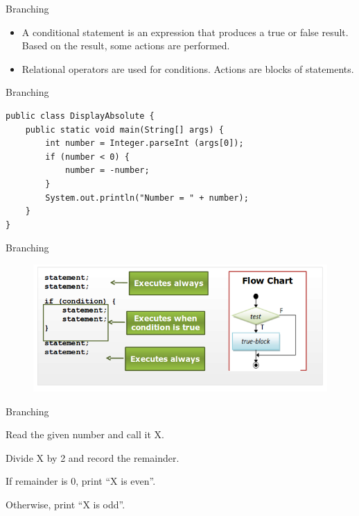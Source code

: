 \documentclass[12pt]{beamer}
\begin{document}
\begin{frame}{Branching}
 \begin{itemize}
  \item A conditional statement is an expression that produces a true or false result. Based on the result, some actions are performed.
  \item Relational operators are used for conditions. Actions are blocks of statements. 
 \end{itemize}
\end{frame}

\begin{frame}[fragile]{Branching}
 \begin{lstlisting}[numbers=none]
public class DisplayAbsolute {
    public static void main(String[] args) {
        int number = Integer.parseInt (args[0]);
        if (number < 0) {
            number = -number;
        }
        System.out.println("Number = " + number);
    }
}
 \end{lstlisting}
\end{frame}

\begin{frame}{Branching}
 \begin{figure}[H]
 \begin{center}
   \includegraphics[scale=.45]{branching-if-syntax.png}   
 \end{center}
  \end{figure}
\end{frame}

\begin{frame}{Branching}
 \hspace{4cm}{22323020}
 
 \vspace{2pc}
Read the given number and call it X.

Divide X by 2 and record the remainder.

If remainder is 0, print ``X is even''.

Otherwise, print ``X is odd''.
\end{frame}
\end{document}
